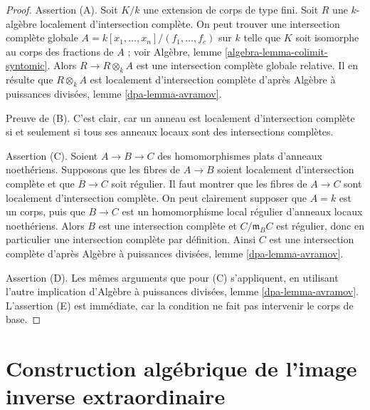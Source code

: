 \begin{proof}
Assertion (A). Soit $K/k$ une extension de corps de type fini.
Soit $R$ une $k$-algèbre localement d'intersection complète.
On peut trouver une intersection complète globale
$A = k[x_1, \ldots, x_n]/(f_1, \ldots, f_c)$
sur $k$ telle que $K$ soit isomorphe au corps des fractions de $A$ ;
voir Algèbre, lemme \ref{algebra-lemma-colimit-syntomic}.
Alors $R \to R \otimes_k A$ est une intersection complète globale relative.
Il en résulte que $R \otimes_k A$ est localement d'intersection complète
d'après Algèbre à puissances divisées, lemme \ref{dpa-lemma-avramov}.

\medskip\noindent
Preuve de (B). C'est clair, car un anneau est localement d'intersection
complète si et seulement si tous ses anneaux locaux sont des intersections complètes.

\medskip\noindent
Assertion (C). Soient $A \to B \to C$ des homomorphismes plats d'anneaux noethériens.
Supposons que les fibres de $A \to B$ soient localement d'intersection complète
et que $B \to C$ soit régulier. Il faut montrer que les fibres de $A \to C$
sont localement d'intersection complète.
On peut clairement supposer que $A = k$ est un corps,
puis que $B \to C$ est un homomorphisme local régulier d'anneaux locaux noethériens.
Alors $B$ est une intersection complète et $C/\mathfrak m_B C$ est régulier,
donc en particulier une intersection complète par définition.
Ainsi $C$ est une intersection complète d'après
Algèbre à puissances divisées, lemme \ref{dpa-lemma-avramov}.

\medskip\noindent
Assertion (D). Les mêmes arguments que pour (C) s'appliquent,
en utilisant l'autre implication d'Algèbre à puissances divisées,
lemme \ref{dpa-lemma-avramov}.
L'assertion (E) est immédiate, car la condition ne fait pas intervenir le corps de base.
\end{proof}






\section{Construction algébrique de l'image inverse extraordinaire}
\label{section-relative-dualizing-complex-algebraic}

